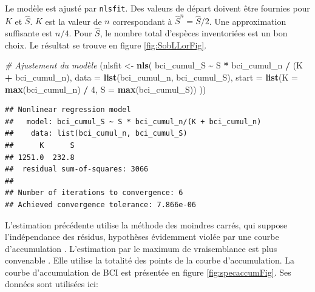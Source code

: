 \documentclass[
  11pt,
  american,
  a4paper,
  extrafontsizes,onecolumn,openright
  ]{memoir}
\newenvironment{Shaded}{\begin{snugshade}}{\end{snugshade}}
\newcommand{\AttributeTok}[1]{\textcolor[rgb]{0.13,0.29,0.53}{#1}}
\newcommand{\CommentTok}[1]{\textcolor[rgb]{0.56,0.35,0.01}{\textit{#1}}}
\newcommand{\DecValTok}[1]{\textcolor[rgb]{0.00,0.00,0.81}{#1}}
\newcommand{\FunctionTok}[1]{\textcolor[rgb]{0.13,0.29,0.53}{\textbf{#1}}}
\newcommand{\NormalTok}[1]{#1}
\newcommand{\OtherTok}[1]{\textcolor[rgb]{0.56,0.35,0.01}{#1}}
\newcommand{\SpecialCharTok}[1]{\textcolor[rgb]{0.81,0.36,0.00}{\textbf{#1}}}
\begin{document}
\normalsize

Le modèle est ajusté par \texttt{nlsfit}.
Des valeurs de départ doivent être fournies pour \(K\) et \(\hat{S}\).
\(K\) est la valeur de \(n\) correspondant à \(\hat{S}^{n} = \hat{S} / 2\).
Une approximation suffisante est \(n / 4\).
Pour \(\hat{S}\), le nombre total d'espèces inventoriées est un bon choix.
Le résultat se trouve en figure \ref{fig:SobLLorFig}.

\scriptsize

\begin{Shaded}
\begin{Highlighting}[]
\CommentTok{\# Ajustement du modèle}
\NormalTok{(nlsfit }\OtherTok{\textless{}{-}} \FunctionTok{nls}\NormalTok{(}
\NormalTok{  bci\_cumul\_S }\SpecialCharTok{\textasciitilde{}}\NormalTok{ S }\SpecialCharTok{*}\NormalTok{ bci\_cumul\_n }\SpecialCharTok{/}\NormalTok{ (K }\SpecialCharTok{+}\NormalTok{ bci\_cumul\_n), }
  \AttributeTok{data =} \FunctionTok{list}\NormalTok{(bci\_cumul\_n, bci\_cumul\_S), }
  \AttributeTok{start =} \FunctionTok{list}\NormalTok{(}\AttributeTok{K =} \FunctionTok{max}\NormalTok{(bci\_cumul\_n) }\SpecialCharTok{/} \DecValTok{4}\NormalTok{, }\AttributeTok{S =} \FunctionTok{max}\NormalTok{(bci\_cumul\_S))}
\NormalTok{))}
\end{Highlighting}
\end{Shaded}

\begin{verbatim}
## Nonlinear regression model
##   model: bci_cumul_S ~ S * bci_cumul_n/(K + bci_cumul_n)
##    data: list(bci_cumul_n, bci_cumul_S)
##      K      S 
## 1251.0  232.8 
##  residual sum-of-squares: 3066
## 
## Number of iterations to convergence: 6 
## Achieved convergence tolerance: 7.866e-06
\end{verbatim}

\normalsize

L'estimation précédente utilise la méthode des moindres carrés, qui suppose l'indépendance des résidus, hypothèses évidemment violée par une courbe d'accumulation \autocite{Colwell1994}.
L'estimation par le maximum de vraisemblance est plus convenable \autocite{Raaijmakers1987}.
Elle utilise la totalité des points de la courbe d'accumulation.
La courbe d'accumulation de BCI est présentée en figure \ref{fig:specaccumFig}.
Ses données sont utilisées ici:

\scriptsize
\end{document}

